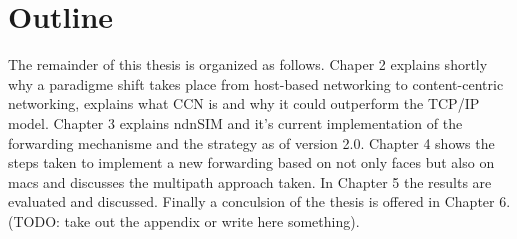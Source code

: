 \newpage
\section{Outline}

The remainder of this thesis is organized as follows. Chaper 2 explains shortly why a paradigme shift takes place from host-based networking to content-centric networking, explains what CCN is and why it could outperform the TCP/IP model. Chapter 3 explains ndnSIM and it's current implementation of the forwarding mechanisme and the strategy as of version 2.0. Chapter 4 shows the steps taken to implement a new forwarding based on not only faces but also on macs and discusses the multipath approach taken. In Chapter 5 the results are evaluated and discussed. Finally a conculsion of the thesis is offered in Chapter 6. (TODO: take out the appendix or write here something).
